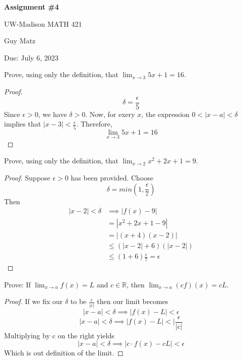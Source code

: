\documentclass{article} %
\theoremstyle{plain}
\theoremstyle{definition}
\newcommand{\Rb}{\mathbb{R}}
\begin{document}
\begin{center}
\Large{\textbf{Assignment \#4}
            
UW-Madison MATH 421} 
\vspace{5pt}
        
\normalsize{  Guy Matz%
        
Due: July 6, 2023}   
\vspace{15pt}
        
\end{center}




\noindent{} Prove, using only the definition, that $\lim_{x \rightarrow 3} 5x+1 = 16$. 

\begin{proof} 

    \[ \delta = \frac{\epsilon}{5} \]
  Since $\epsilon>0$, we have $\delta > 0$.  Now, for exery $x$, the
  expression $0 < |x-a| < \delta$ implies that
  $|x-3| < \frac{\epsilon}{5}$.  Therefore, 
    \[ \lim_{x \to 3} 5x+1 = 16  \]

\end{proof} 

\newpage
\noindent{} Prove, using only the definition, that $\lim_{x \rightarrow 2} x^2+2x+1 = 9$. 

\begin{proof} 
  Suppose $\epsilon>0$ has been provided.  Choose
    \[ \delta = min(1, \frac{\epsilon}{7} ) \]
    Then 
    \begin{align*}
      |x-2| < \delta &\implies |f(x) - 9| \\
                &= |x^2 + 2x + 1 -9| \\
                &= |(x+4)(x-2)| \\
                &\leq (|x-2|+6)(|x-2|) \\
                &\leq (1 + 6) \frac{\epsilon}{7} = \epsilon
    \end{align*}
\end{proof} 

\newpage
\noindent{} Prove: If $\lim_{x \rightarrow a} f(x) = L$ and $c \in \Rb$, then $\lim_{x \rightarrow a} (cf)(x) = cL$. 

\begin{proof} 
  If we fix our $\delta$ to be $\frac{\epsilon}{|c|}$ then our limit 
  becomes
    \[ |x-a| < \delta \implies |f(x)  -L| < \epsilon  \]
    \[ |x-a| < \delta \implies |f(x)  -L| < |\frac{\epsilon}{|c|}  \]
    Multiplying by c on the right yields
    \[ |x-a| < \delta \implies |c \cdot f(x)  -cL| < \epsilon  \]
    Which is out definition of the limit.

\end{proof} 
\end{document}
